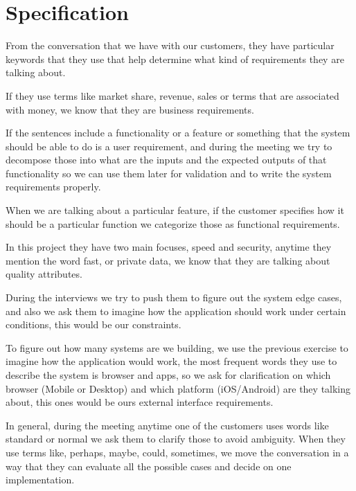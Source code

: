 \section{Specification}
From the conversation that we have with our customers, they have particular 
keywords that they use that help determine what kind of requirements they 
are talking about. \newline

\noindent If they use terms like market share, revenue, sales or terms that 
are associated with money, we know that they are business requirements. \newline

\noindent If the sentences include a functionality or a feature or something 
that the system should be able to do is a user requirement, and during the 
meeting we try to decompose those into what are the inputs and the expected 
outputs of that functionality so we can use them later for validation and to 
write the system requirements properly. \newline

\noindent When we are talking about a particular feature, if the customer 
specifies how it should be a particular function we categorize those as 
functional requirements. \newline

\noindent In this project they have two main focuses, speed and security, 
anytime they mention the word fast, or private data, we know that they are 
talking about quality attributes. \newline

\noindent During the interviews we try to push them to figure out the system 
edge cases, and also we ask them to imagine how the application should work 
under certain conditions, this would be our constraints. \newline

\noindent To figure out how many systems are we building, we use the previous 
exercise to imagine how the application would work, the most frequent words 
they use to describe the system is browser and apps, so we ask for 
clarification on which browser (Mobile or Desktop) and which 
platform (iOS/Android) are they talking about, this ones would be ours 
external interface requirements. \newline

\noindent In general, during the meeting anytime one of the customers uses 
words like standard or normal we ask them to clarify those to avoid ambiguity. 
When they use terms like, perhaps, maybe, could, sometimes, we move the 
conversation in a way that they can evaluate all the possible cases and decide 
on one implementation.  \newline

